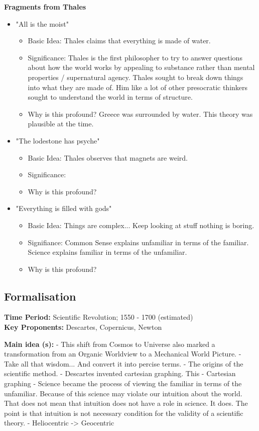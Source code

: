 \documentclass[twoside]{article}
\begin{document}
\textbf{Fragments from Thales}
\begin{itemize}
  \item "All is the moist"
    \begin{itemize}
      \item Basic Idea: Thales claims that everything is made of water.
      \item Significance: Thales is the first philosopher to try to answer questions
            about how the world works by appealing to substance rather than mental
            properties / supernatural agency. Thales sought to break down things into
            what they are made of. Him like a lot of other presocratic thinkers
            sought to understand the world in terms of structure.
      \item Why is this profound? Greece was surrounded by water. This theory
            was plausible at the time.
    \end{itemize}
  \item "The lodestone has psyche"
    \begin{itemize}
      \item Basic Idea: Thales observes that magnets are weird.
      \item Significance:
      \item Why is this profound?
    \end{itemize}
  \item "Everything is filled with gods"
    \begin{itemize}
      \item Basic Idea: Things are complex... Keep looking at stuff nothing is boring.
      \item Signifiance: Common Sense explains unfamiliar in terms of the familiar.
      Science explains familiar in terms of the unfamiliar.
      \item Why is this profound?
    \end{itemize}
\end{itemize}

\subsection{Formalisation}
\textbf{Time Period: } Scientific Revolution; 1550 - 1700 (estimated) \\
\textbf{Key Proponents: } Descartes, Copernicus, Newton

\textbf{Main idea (s): }
- This shift from Cosmos to Universe also marked a transformation from an Organic
Worldview to a Mechanical World Picture.
- Take all that wisdom... And convert it into percise terms.
- The origins of the scientific method.
- Descartes invented cartesian graphing. This
- Cartesian graphing
- Science became the process of viewing the familiar in terms of the unfamiliar. Because
of this science may violate our intuition about the world. That does not mean
that intuition does not have a role in science. It does. The point is that intuition
is not necessary condition for the validity of a scientific theory.
- Heliocentric -> Geocentric
\end{document}
